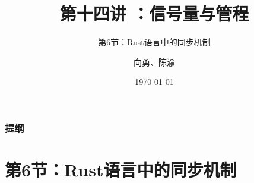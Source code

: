 


\title[第14讲]{第十四讲 ：信号量与管程} %
\subtitle{第6节：Rust语言中的同步机制}
\author{向勇、陈渝} %
\date{\today} %




\begin{frame}
\titlepage %
\end{frame}

\begin{frame}
\frametitle{提纲} %
\tableofcontents %
\end{frame}
\section{第6节：Rust语言中的同步机制} %
